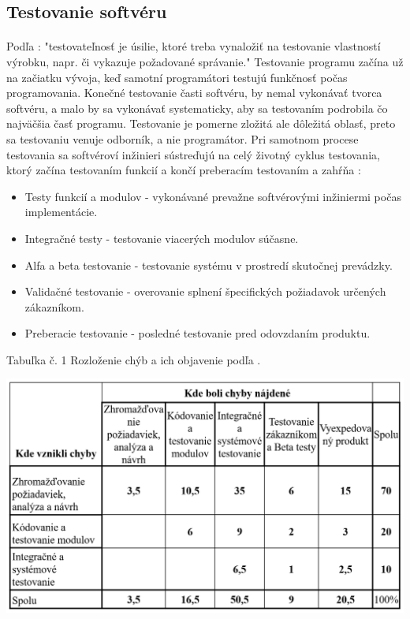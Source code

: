 \documentclass[10pt,twoside,slovak,a4paper]{article}
\begin{document}
\subsection{Testovanie softvéru} \label{testovanie}
\paragraph{}
 Podľa \cite{swemb}: "testovateľnosť je úsilie, ktoré treba vynaložiť na testovanie vlastností výrobku, napr. či vykazuje požadované správanie." Testovanie programu \cite{CSEroadmap} začína už na začiatku vývoja, keď samotní programátori testujú funkčnosť počas programovania. Konečné testovanie časti softvéru, by nemal vykonávať tvorca softvéru, a malo by sa vykonávať systematicky, aby sa testovaním podrobila čo najväčšia časť programu. Testovanie je pomerne zložitá ale dôležitá oblasť, preto sa testovaniu venuje odborník, a nie programátor.
Pri samotnom procese testovania sa softvéroví inžinieri sústreďujú na celý životný cyklus testovania, ktorý začína testovaním funkcií a končí preberacím testovaním a zahŕňa \cite{testovanie}:
\begin{itemize}
	\item Testy funkcií a modulov - vykonávané prevažne softvérovými inžiniermi počas implementácie.
	\item Integračné testy - testovanie viacerých modulov súčasne.
	\item Alfa a beta testovanie - testovanie systému v prostredí skutočnej prevádzky. 
    \item Validačné testovanie - overovanie splnení špecifických požiadavok určených zákazníkom.
    \item Preberacie testovanie - posledné testovanie pred odovzdaním produktu.
\end{itemize}
\begin{center}
    Tabuľka č. 1 Rozloženie chýb a ich objavenie podľa \cite{testovanie}.
\end{center}
\begin{center}
   \includegraphics[scale=0.4]{tabulka.png}
\end{center}
\end{document}
